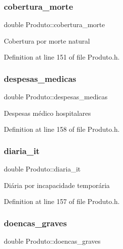 \subsubsection{\texorpdfstring{cobertura\+\_\+morte}{cobertura\_morte}}
{\footnotesize\ttfamily double Produto\+::cobertura\+\_\+morte\hspace{0.3cm}{\ttfamily [private]}}

Cobertura por morte natural 

Definition at line 151 of file Produto.\+h.

\hypertarget{class_produto_a9df2c3ba3304f3084e914a5a1f548645}{}\label{class_produto_a9df2c3ba3304f3084e914a5a1f548645} 
\subsubsection{\texorpdfstring{despesas\+\_\+medicas}{despesas\_medicas}}
{\footnotesize\ttfamily double Produto\+::despesas\+\_\+medicas\hspace{0.3cm}{\ttfamily [private]}}

Despesas médico hospitalares 

Definition at line 158 of file Produto.\+h.

\hypertarget{class_produto_afefb98ad26b77c674a14a3f4607db0e7}{}\label{class_produto_afefb98ad26b77c674a14a3f4607db0e7} 
\subsubsection{\texorpdfstring{diaria\+\_\+it}{diaria\_it}}
{\footnotesize\ttfamily double Produto\+::diaria\+\_\+it\hspace{0.3cm}{\ttfamily [private]}}

Diária por incapacidade temporária 

Definition at line 157 of file Produto.\+h.

\hypertarget{class_produto_ae09501fc8a8334a1af066660b16afeb7}{}\label{class_produto_ae09501fc8a8334a1af066660b16afeb7} 
\subsubsection{\texorpdfstring{doencas\+\_\+graves}{doencas\_graves}}
{\footnotesize\ttfamily double Produto\+::doencas\+\_\+graves\hspace{0.3cm}{\ttfamily [private]}}

